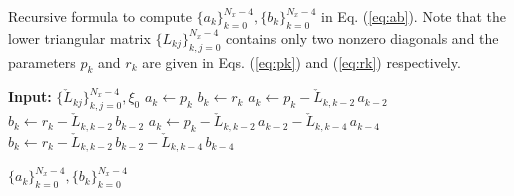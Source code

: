 \documentclass[11pt, oneside]{elsarticle}
\newcommand{\N}[1]{\check{#1}}
\begin{document}
\begin{algorithm}
	\caption{Recursive formula to compute $\{a_k\}_{k=0}^{N_x-4}, 
	\{b_k\}_{k=0}^{N_x-4}$ in Eq. (\ref{eq:ab}). Note that the lower triangular 
	matrix $\{L_{kj}\}_{k,j=0}^{N_x-4}$ contains only two nonzero diagonals and 
	the parameters $p_k$ and $r_k$ are given in Eqs. (\ref{eq:pk}) and 
	(\ref{eq:rk}) respectively. \label{alg:ab}}
	\begin{algorithmic}[1]
		\State \textbf{Input:} $ \{\N{L}_{kj}\}_{k,j=0}^{N_x-4}, \xi_0$
		     \State $a_k \gets p_k$
		     \State $b_k \gets r_k$
		\EndFor
		    \State $a_k \gets p_k - \N{L}_{k,k-2}\,a_{k-2}$
		    \State $b_k \gets r_k - \N{L}_{k, k-2}\,b_{k-2}$
		\EndFor
     		\State $a_k \gets p_k - \N{L}_{k,k-2}\,a_{k-2} - \N{L}_{k, k-4} 
\,a_{k-4}$
	    	\State $b_k \gets r_k - \N{L}_{k, k-2}\,b_{k-2}- \N{L}_{k, k-4} 
\,b_{k-4}$
		\EndFor

		\State \Return $\{a_k\}_{k=0}^{N_x-4}, \{b_k\}_{k=0}^{N_x-4}$
        \EndProcedure
\end{algorithmic}
\end{algorithm}
\end{document}

